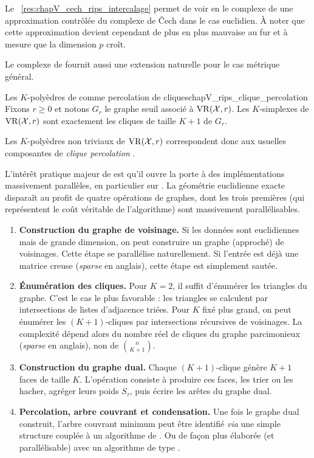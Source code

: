 Le \Res~\ref{res:chapV_cech_rips_intercalage} permet de voir en le complexe de  une approximation contrôlée du complexe de \v Cech dans le cas euclidien. À noter que cette approximation devient cependant de plus en plus mauvaise au fur et à mesure que la dimension $p$ croît.

Le complexe de  fournit aussi une extension naturelle pour le cas métrique général.

\begin{Fait}{Les $K$-polyèdres de  comme percolation de cliques}{chapV_rips_clique_percolation}
Fixons $r\ge0$ et notons $G_r$ le graphe seuil associé à $\mathrm{VR}(\mathcal{X},r)$. Les $K$-simplexes de $\mathrm{VR}(\mathcal{X},r)$ sont exactement les cliques de taille $K+1$ de $G_r$.

Les $K$-polyèdres non triviaux de $\mathrm{VR}(\mathcal{X},r)$ correspondent donc aux usuelles composantes de \emph{clique percolation} \cite{KCliquePercolation}.
\end{Fait}


L'intérêt pratique majeur de  est qu'il ouvre la porte à des implémentations massivement parallèles, en particulier sur . La géométrie euclidienne exacte disparaît au profit de quatre opérations de graphes, dont les trois premières (qui représentent le coût véritable de l'algorithme) sont massivement parallélisables.

\begin{enumerate}
    \item \textbf{Construction du graphe de voisinage.} Si les données sont euclidiennes mais de grande dimension, on peut construire un graphe (approché) de voisinages. Cette étape se parallélise naturellement. Si l'entrée est déjà une matrice creuse (\emph{sparse} en anglais), cette étape est simplement sautée.

    \item \textbf{Énumération des cliques.} Pour $K=2$, il suffit d'énumérer les triangles du graphe. C'est le cas le plus favorable : les triangles se calculent par intersections de listes d'adjacence triées. Pour $K$ fixé plus grand, on peut énumérer les $(K+1)$-cliques par intersections récursives de voisinages. La complexité dépend alors du nombre réel de cliques du graphe parcimonieux (\emph{sparse} en anglais), non de $\binom n{K+1}$.

    \item \textbf{Construction du graphe dual.} Chaque $(K+1)$-clique génère $K+1$ faces de taille $K$. L'opération consiste à produire ces faces, les trier ou les hacher, agréger leurs poids $S_\tau$, puis écrire les arêtes du graphe dual.

    \item \textbf{Percolation, arbre couvrant et condensation.} Une fois le graphe dual construit, l'arbre couvrant minimum peut être identifié \emph{via} une simple structure  \cite{Tarjan1975} couplée à un algorithme de  \cite{Kruskal1956}. Ou de façon plus élaborée (et parallélisable) avec un algorithme de type .
\end{enumerate}


